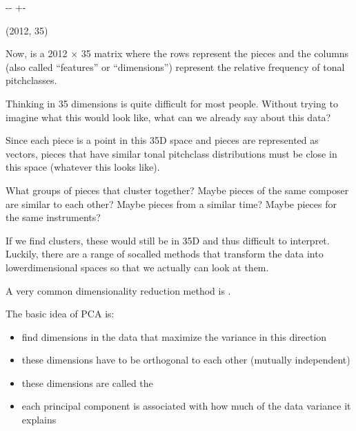 \documentclass[letterpaper,10pt,english]{sphinxmanual}
\newlength\nbsphinxcodecellspacing
\begin{document}
{

\kern-\sphinxverbatimsmallskipamount\kern-\baselineskip
\kern+\FrameHeightAdjust\kern-\fboxrule
\vspace{\nbsphinxcodecellspacing}

\begin{sphinxVerbatim}[commandchars=\\\{\}]
\llap{\color{nbsphinxout}[14]:\,\hspace{\fboxrule}\hspace{\fboxsep}}(2012, 35)
\end{sphinxVerbatim}
}

Now,  is a 2012 \(\times\) 35 matrix where the rows represent the pieces and the columns (also called “features” or “dimensions”) represent the relative frequency of tonal pitch\sphinxhyphen{}classes.

Thinking in 35 dimensions is quite difficult for most people. Without trying to imagine what this would look like, what can we already say about this data?

Since each piece is a point in this 35\sphinxhyphen{}D space and pieces are represented as vectors, pieces that have similar tonal pitch\sphinxhyphen{}class distributions must be close in this space (whatever this looks like).

What groups of pieces that cluster together? Maybe pieces of the same composer are similar to each other? Maybe pieces from a similar time? Maybe pieces for the same instruments?

If we find clusters, these would still be in 35\sphinxhyphen{}D and thus difficult to interpret. Luckily, there are a range of so\sphinxhyphen{}called  methods that transform the data into lower\sphinxhyphen{}dimensional spaces so that we actually can look at them.

A very common dimensionality reduction method is .

The basic idea of PCA is:
\begin{itemize}
\item {} 
find dimensions in the data that maximize the variance in this direction

\item {} 
these dimensions have to be orthogonal to each other (mutually independent)

\item {} 
these dimensions are called the 

\item {} 
each principal component is associated with how much of the data variance it explains

\end{itemize}
\end{document}
